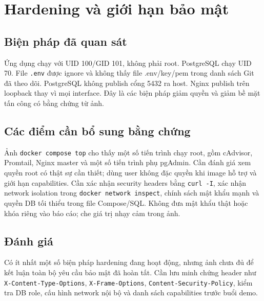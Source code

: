 \documentclass[12pt,a4paper]{report}
\begin{document}
\chapter{Hardening và giới hạn bảo mật}
\section{Biện pháp đã quan sát}
Ứng dụng chạy với UID 100/GID 101, không phải root. PostgreSQL chạy UID 70. File \texttt{.env} được ignore và không thấy file .env/key/pem trong danh sách Git đã theo dõi. PostgreSQL không publish cổng 5432 ra host. Nginx publish trên loopback thay vì mọi interface. Đây là các biện pháp giảm quyền và giảm bề mặt tấn công có bằng chứng từ ảnh.
\section{Các điểm cần bổ sung bằng chứng}
Ảnh \texttt{docker compose top} cho thấy một số tiến trình chạy root, gồm cAdvisor, Promtail, Nginx master và một số tiến trình phụ pgAdmin. Cần đánh giá xem quyền root có thật sự cần thiết; dùng user không đặc quyền khi image hỗ trợ và giới hạn capabilities. Cần xác nhận security headers bằng \texttt{curl -I}, xác nhận network isolation trong \texttt{docker network inspect}, chính sách mật khẩu mạnh và quyền DB tối thiểu trong file Compose/SQL. Không đưa mật khẩu thật hoặc khóa riêng vào báo cáo; che giá trị nhạy cảm trong ảnh.
\section{Đánh giá}
Có ít nhất một số biện pháp hardening đang hoạt động, nhưng ảnh chưa đủ để kết luận toàn bộ yêu cầu bảo mật đã hoàn tất. Cần lưu minh chứng header như \texttt{X-Content-Type-Options}, \texttt{X-Frame-Options}, \texttt{Content-Security-Policy}, kiểm tra DB role, cấu hình network nội bộ và danh sách capabilities trước buổi demo.
\end{document}
